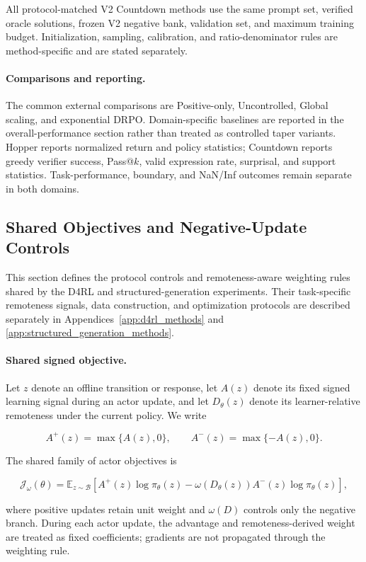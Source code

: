 \documentclass{article}
\theoremstyle{plain}
\theoremstyle{definition}
\theoremstyle{remark}
\begin{document}
All protocol-matched V2 Countdown methods use the same prompt set,
verified oracle solutions, frozen V2 negative bank, validation set,
and maximum training budget. Initialization, sampling, calibration,
and ratio-denominator rules are method-specific and are stated
separately.

\paragraph{Comparisons and reporting.}
The common external comparisons are Positive-only, Uncontrolled,
Global scaling, and exponential DRPO. Domain-specific baselines are
reported in the overall-performance section rather than treated as
controlled taper variants. Hopper reports normalized return and policy
statistics; Countdown reports greedy verifier success, Pass@$k$, valid
expression rate, surprisal, and support statistics. Task-performance,
boundary, and NaN/Inf outcomes remain separate in both domains.
\subsection{Shared Objectives and Negative-Update Controls}
\label{app:shared_methods}

This section defines the protocol controls and remoteness-aware
weighting rules shared by the D4RL and structured-generation experiments.
Their task-specific remoteness signals, data construction, and optimization
protocols are described separately in
Appendices~\ref{app:d4rl_methods} and
\ref{app:structured_generation_methods}.

\paragraph{Shared signed objective.}

Let \(z\) denote an offline transition or response, let
\(A(z)\) denote its fixed signed learning signal during an actor update,
and let \(D_\theta(z)\) denote its learner-relative remoteness under the
current policy. We write

\[
A^{+}(z)=\max\{A(z),0\},
\qquad
A^{-}(z)=\max\{-A(z),0\}.
\]

The shared family of actor objectives is

\[
\mathcal{J}_{\omega}(\theta)
=
\mathbb{E}_{z\sim\mathcal{B}}
\left[
A^{+}(z)\log \pi_\theta(z)
 -
\omega\!\left(D_\theta(z)\right)
A^{-}(z)\log \pi_\theta(z)
\right],
\]

where positive updates retain unit weight and
\(\omega(D)\) controls only the negative branch. During each actor
update, the advantage and remoteness-derived weight are treated as
fixed coefficients; gradients are not propagated through the weighting
rule.
\end{document}
